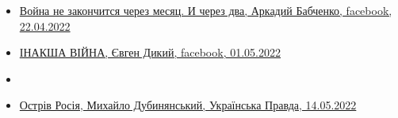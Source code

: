 \begin{itemize}
\item \hyperlink{22_04_2022.fb.babchenko_arkadii.1.vojna_ne_zakonchitsja}{%
Война не закончится через месяц. И через два, Аркадий Бабченко, facebook, 22.04.2022%
}


\item \hyperlink{01_05_2022.fb.dykyj_evgen.1.inaksha_vijna}{%
ІНАКША ВІЙНА, Євген Дикий, facebook, 01.05.2022%
}

\item \hyperlink{09_05_2022.fb.ohotin_petro.1.zorjanyj_chas_ukrainy}{%
}

\item \hyperlink{14_05_2022.stz.news.ua.pravda.1.ostriv_rosia}{%
Острів Росія, Михайло Дубинянський, Українська Правда, 14.05.2022%
}

\end{itemize} %
